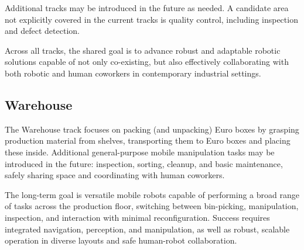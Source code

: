 \documentclass[letterpaper, 11pt]{extarticle}
\begin{document}
Additional tracks may be introduced in the future as needed. A candidate area not explicitly covered in the current tracks is quality control, including inspection and defect detection.

Across all tracks, the shared goal is to advance robust and adaptable robotic solutions capable of not only co-existing, but also effectively collaborating with both robotic and human coworkers in contemporary industrial settings.

\subsection{Warehouse} %



The Warehouse track focuses on packing (and unpacking) Euro boxes by grasping production material from shelves, transporting them to Euro boxes and placing these inside.
Additional general-purpose mobile manipulation tasks may be introduced in the future: inspection, sorting, cleanup, and basic
maintenance, safely sharing space and coordinating with human coworkers.

The long-term goal is versatile mobile robots capable of performing a broad range of tasks across
the production floor, switching between bin-picking, manipulation, inspection, and interaction with
minimal reconfiguration. Success requires integrated navigation, perception, and manipulation, as
well as robust, scalable operation in diverse layouts and safe human-robot collaboration.
\end{document}

